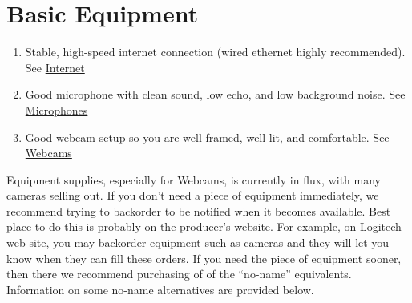\chapter{Basic Equipment}
\label{ch:equipment}

\begin{gram}
\label{grm:equipment::checklist}
	\begin{enumerate}
		\item Stable, high-speed internet connection (wired ethernet highly recommended). See \href{sec:equipment::internet}{Internet}
		\item Good microphone with clean sound, low echo, and low background noise. See \href{sec:equipment::mics}{Microphones}
		\item Good webcam setup so you are well framed, well lit, and comfortable. See \href{sec:equipment::web-cam}{Webcams}
	\end{enumerate}
\end{gram}

\begin{important}
Equipment supplies, especially for Webcams, is currently in flux, with many cameras selling out. 
%
If you don't need a piece of equipment immediately, we recommend trying to backorder to be notified when it becomes available.  
%
Best place to do this is probably on the producer's website.
%
For example, on Logitech web site, you may backorder equipment such as
cameras and they will let you know when they can fill these orders.
%
If you need the piece of equipment sooner, then there we recommend
purchasing of of the ``no-name'' equivalents.  
%
Information on some no-name alternatives are provided below.
\end{important}


